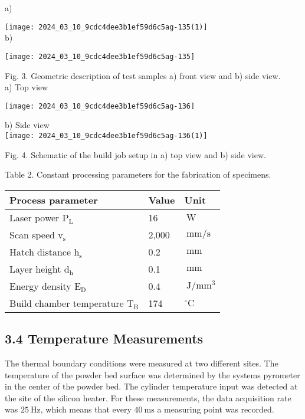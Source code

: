 \documentclass[10pt]{article}
\begin{document}
a)

\texttt{[image: 2024\_03\_10\_9cdc4dee3b1ef59d6c5ag-135(1)]}\\
b)

\begin{center}
\texttt{[image: 2024\_03\_10\_9cdc4dee3b1ef59d6c5ag-135]}
\end{center}

Fig. 3. Geometric description of test samples a) front view and b) side view.\\
a) Top view

\begin{center}
\texttt{[image: 2024\_03\_10\_9cdc4dee3b1ef59d6c5ag-136]}
\end{center}

b) Side view\\
\texttt{[image: 2024\_03\_10\_9cdc4dee3b1ef59d6c5ag-136(1)]}

Fig. 4. Schematic of the build job setup in a) top view and b) side view.

Table 2. Constant processing parameters for the fabrication of specimens.

\begin{center}
\begin{tabular}{l|l|l}
\hline
Process parameter & Value & Unit \\
\hline
Laser power $\mathrm{P}_{\mathrm{L}}$ & 16 & $\mathrm{~W}$ \\
\hline
Scan speed $\mathrm{v}_{\mathrm{s}}$ & 2,000 & $\mathrm{~mm} / \mathrm{s}$ \\
\hline
Hatch distance $\mathrm{h}_{\mathrm{s}}$ & 0.2 & $\mathrm{~mm}$ \\
\hline
Layer height $\mathrm{d}_{\mathrm{h}}$ & 0.1 & $\mathrm{~mm}$ \\
\hline
Energy density $\mathrm{E}_{\mathrm{D}}$ & 0.4 & $\mathrm{~J} / \mathrm{mm}^{3}$ \\
\hline
Build chamber temperature $\mathrm{T}_{\mathrm{B}}$ & 174 & ${ }^{\circ} \mathrm{C}$ \\
\hline
\end{tabular}
\end{center}

\subsection*{3.4 Temperature Measurements}
The thermal boundary conditions were measured at two different sites. The temperature of the powder bed surface was determined by the systems pyrometer in the center of the powder bed. The cylinder temperature input was detected at the site of the silicon heater. For these measurements, the data acquisition rate was $25 \mathrm{~Hz}$, which means that every $40 \mathrm{~ms}$ a measuring point was recorded.
\end{document}
